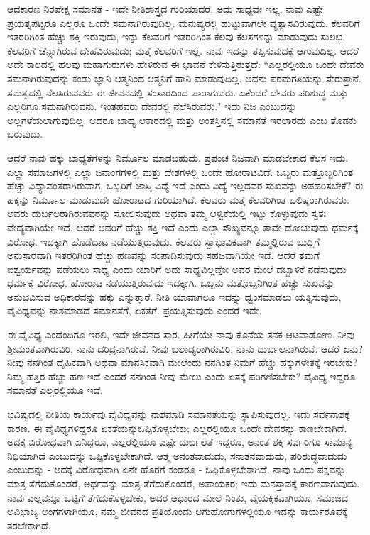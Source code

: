 ಆದಕಾರಣ ನಿರಪೇಕ್ಷ ಸಮಾನತೆ  - ಇದೇ ನೀತಿಶಾಸ್ತ್ರದ ಗುರಿಯಾದರೆ, ಅದು ಸಾಧ್ಯವೇ ಇಲ್ಲ. ನಾವು ಎಷ್ಟೇ ಪ್ರಯತ್ನಪಟ್ಟರೂ ಎಲ್ಲರೂ ಒಂದೇ ಸಮನಾಗಿರುವುದಿಲ್ಲ. ಮನುಷ್ಯರಲ್ಲಿ ಹುಟ್ಟುವಾಗಲೇ ವ್ಯತ್ಯಾಸವಿರುವುದು. ಕೆಲವರಿಗೆ ಇತರರಿಗಿಂತ ಹೆಚ್ಚು ಶಕ್ತಿ ಇರುವುದು, ಇನ್ನು ಕೆಲವರಿಗೆ ಇತರರಿಗಿಂತ ಕೆಲವು ಕೆಲಸಗಳನ್ನು ಮಾಡುವುದು ಸುಲಭ. ಕೆಲವರಿಗೆ ಚೆನ್ನಾಗಿರುವ ದೇಹವಿರುವುದು; ಮತ್ತೆ ಕೆಲವರಿಗೆ ಇಲ್ಲ. ನಾವು ಇದನ್ನು ತಪ್ಪಿಸುವುದಕ್ಕೆ ಆಗುವುದಿಲ್ಲ. ಆದರೆ ಅದೇ ಕಾಲದಲ್ಲಿ ಹಲವು ಮಹಾಗುರುಗಳು ಹೇಳಿರುವ ಈ ಭಾವನೆ ಕೇಳಿಸುತ್ತಿರುತ್ತದೆ: “ಎಲ್ಲರಲ್ಲಿಯೂ ಒಂದೇ ದೇವರು ಸಮನಾಗಿರುವುದನ್ನು ಕಂಡು ಜ್ಞಾನಿ ಆತ್ಮನಿಂದ ಆತ್ಮನಿಗೆ ಹಾನಿ ಮಾಡುವುದಿಲ್ಲ. ಅವನು ಪರಮಗತಿಯನ್ನು ಸೇರುತ್ತಾನೆ. ಸಮತ್ವದಲ್ಲಿ ನೆಲಸಿರುವವರು ಈ ಜೀವನದಲ್ಲಿ ಸಂಸಾರದಿಂದ ಪಾರಾಗುವರು. ಏಕೆಂದರೆ ದೇವರು ಪರಿಶುದ್ಧ ಮತ್ತು ಎಲ್ಲರಿಗೂ ಸಮನಾಗಿರುವನು. ಇಂತಹವರು ದೇವರಲ್ಲಿ ನೆಲೆಸಿರುವರು." ಇದು ನಿಜ ಎಂಬುದನ್ನು ಅಲ್ಲಗಳೆಯಲಾಗುವುದಿಲ್ಲ. ಆದರೂ ಬಾಹ್ಯ ಆಕಾರದಲ್ಲಿ ಮತ್ತು ಅಂತಸ್ತಿನಲ್ಲಿ ಸಮಾನತೆ ಇರಲಾರದು ಎಂಬ ತೊಡಕು ಬರುವುದು.

ಆದರೆ ನಾವು ಹಕ್ಕು ಬಾಧ್ಯತೆಗಳನ್ನು ನಿರ್ಮೂಲ ಮಾಡಬಹುದು. ಪ್ರಪಂಚ ನಿಜವಾಗಿ ಮಾಡಬೇಕಾದ ಕೆಲಸ ಇದು. ಎಲ್ಲಾ ಸಮಾಜಗಳಲ್ಲಿ ಎಲ್ಲಾ ಜನಾಂಗಗಳಲ್ಲಿ ಮತ್ತು ದೇಶಗಳಲ್ಲಿ ಒಂದೇ ಹೋರಾಟವಿದೆ. ಒಬ್ಬರು ಮತ್ತೊಬ್ಬರಿಗಿಂತ ಹೆಚ್ಚು ವಿದ್ಯಾವಂತರಾಗಿರುವಾಗ, ಒಬ್ಬರಿಗೆ ಜಾಸ್ತಿ ವಿದ್ಯೆ ಇದೆ ಎಂದು ವಿದ್ಯೆ ಇಲ್ಲದವರ ಸುಖವನ್ನು ಅಪಹರಿಸಬೇಕೆ? ಈ ಹಕ್ಕನ್ನು ನಿರ್ಮೂಲ ಮಾಡುವುದೇ ಹೋರಾಟದ ಗುರಿಯಾಗಿದೆ. ಕೆಲವರು ಮತ್ತೆ ಕೆಲವರಿಗಿಂತ ಬಲಿಷ್ಠರಾಗಿರುವರು. ಅವರು ದುರ್ಬಲರಾಗಿರುವವರನ್ನು ಸೋಲಿಸುವುದು ಅಥವಾ ತಮ್ಮ ಆಳ್ವಿಕೆಯಲ್ಲಿ ಇಟ್ಟು ಕೊಳ್ಳುವುದು ಸ್ವತಃ ವೇದ್ಯವಾಗಿಯೇ ಇದೆ. ಆದರೆ ಅವರಿಗೆ ಹೆಚ್ಚು ಶಕ್ತಿ ಇದೆ ಎಂದು ಎಲ್ಲಾ ಸೌಖ್ಯವನ್ನೂ ತಾವೇ ದೋಚುವುದು ಧರ್ಮಕ್ಕೆ ವಿರೋಧ. ಇದಕ್ಕಾಗಿ ಹೊಡೆದಾಟ ನಡೆಯುತ್ತಿರುವುದು. ಕೆಲವರು ಸ್ವಾಭಾವಿಕವಾಗಿ ತಮ್ಮಲ್ಲಿರುವ ಬುದ್ದಿಗೆ ಅನುಸಾರವಾಗಿ ಇತರರಿಗಿಂತ ಹೆಚ್ಚು ಹಣವನ್ನು ಸಂಪಾದಿಸುವುದು ಸಹಜವಾಗಿಯೇ ಇದೆ. ಆದರೆ ತಮಗೆ ಐಶ್ವರ್ಯವನ್ನು ಪಡೆಯಲು ಸಾಧ್ಯ ಎಂದು ಯಾರಿಗೆ ಅದು ಸಾಧ್ಯವಿಲ್ಲವೋ ಅವರ ಮೇಲೆ ದಬ್ಬಾಳಿಕೆ ನಡೆಸುವುದು ಧರ್ಮಕ್ಕೆ ವಿರೋಧ. ಹೋರಾಟ ನಡೆಯುತ್ತಿರುವುದು ಇದಕ್ಕಾಗಿ. ಒಬ್ಬನು ಮತ್ತೊಬ್ಬನಿಗಿಂತ ಹೆಚ್ಚು ಸುಖವನ್ನು ಅನುಭವಿಸುವ ಅಧಿಕಾರವನ್ನು ಹಕ್ಕು ಎನ್ನುತ್ತಾರೆ. ನೀತಿ ಯಾವಾಗಲೂ ಇದನ್ನು ಧ್ವಂಸಮಾಡಲು ಯತ್ನಿಸುವುದು, ವೈವಿಧ್ಯವನ್ನು ನಾಶಮಾಡದೆ ಸಮಾನತೆಗೆ, ಏಕತೆಗೆ. ಪ್ರಯತ್ನಿಸುವುದು ಎಂದರೆ ಇದೇ.

ಈ ವೈವಿಧ್ಯ ಎಂದೆಂದಿಗೂ ಇರಲಿ, ಇದೇ ಜೀವನದ ಸಾರ. ಹೀಗೆಯೇ ನಾವು ಕೊನೆಯ ತನಕ ಆಟವಾಡೋಣ. ನೀವು ಶ‍್ರೀಮಂತವಾಗಿರುವಿರಿ, ನಾನು ದರಿದ್ರನಾಗಿರುವೆ. ನೀವು ಬಲಾಡ್ಯರಾಗಿರುವಿರಿ, ನಾನು ದುರ್ಬಲನಾಗಿರುವೆ. ಆದರೆ ಏನು? ನೀವು ನನಗಿಂತ ದೈಹಿಕವಾಗಿ ಅಥವಾ ಮಾನಸಿಕವಾಗಿ ಮೇಲೆಂದು ನನಗಿಂತ ನಿಮಗೆ ಹೆಚ್ಚು ಹಕ್ಕುಗಳೇತಕ್ಕೆ ಇರಬೇಕು? ನಿಮ್ಮ ಹತ್ತಿರ ಹೆಚ್ಚು ಹಣ ಇದೆ ಎಂದರೆ ನನಗಿಂತ ನೀವು ಮೇಲು ಎಂದು ಏತಕ್ಕೆ ಪರಿಗಣಿಸಬೇಕು? ವೈವಿಧ್ಯ ಇದ್ದರೂ ಸಮಾನತೆ ಎಲ್ಲರಲ್ಲಿಯೂ ಇದೆ.

ಭವಿಷ್ಯದಲ್ಲಿ ನೀತಿಯ ಕಾರ್ಯವು ವೈವಿಧ್ಯವನ್ನು ನಾಶಮಾಡಿ ಸಮಾನತೆಯನ್ನು ಸ್ಥಾಪಿಸುವುದಲ್ಲ. ಇದು ಸರ್ವನಾಶಕ್ಕೆ ಕಾರಣ. ಈ ವೈವಿಧ್ಯಗಳಿದ್ದರೂ ಏಕತೆಯನ್ನು\break ಒಪ್ಪಿಕೊಳ್ಳಬೇಕು; ಎಲ್ಲರಲ್ಲಿಯೂ ಒಂದೇ ದೇವರನ್ನು ಕಾಣಬೇಕಾಗಿದೆ. ಅದಕ್ಕೆ ವಿರೋಧವಾಗಿ ಏನಿದ್ದರೂ, ಎಲ್ಲರಲ್ಲಿಯೂ ಎಷ್ಟೇ ದುರ್ಬಲತೆ ಇದ್ದರೂ, ಅನಂತ ಶಕ್ತಿ ಸರ್ವರಿಗೂ ಸಾಮಾನ್ಯ ನಿಧಿಯಾಗಿದೆ ಎಂಬುದನ್ನು ಒಪ್ಪಿಕೊಳ್ಳಬೇಕಾಗಿದೆ. ಆತ್ಮ ಅನಂತವಾದುದು, ಸನಾತನವಾದುದು, ಪರಿಶುದ್ಧವಾದುದು ಎಂಬುದನ್ನು - ಅದಕ್ಕೆ ವಿರೋಧವಾಗಿ ಏನೇ ಹೊರಗೆ ಕಂಡರೂ - ಒಪ್ಪಿಕೊಳ್ಳಬೇಕಾಗಿದೆ. ನಾವು ಒಂದು ಪಕ್ಷವನ್ನು ಮಾತ್ರ ತೆಗೆದುಕೊಂಡರೆ, ಅರ್ಧವನ್ನು ಮಾತ್ರ ತೆಗೆದುಕೊಂಡರೆ, ಅಪಾಯಕರ; ಇದು ಮನಸ್ತಾಪಕ್ಕೆ ಕಾರಣವಾಗುವುದು. ನಾವು ಎಲ್ಲವನ್ನೂ ಒಟ್ಟಿಗೆ ತೆಗೆದುಕೊಳ್ಳಬೇಕು, ಅದರ ಆಧಾರದ ಮೇಲೆ ನಿಂತು, ವೈಯಕ್ತಿಕವಾಗಿಯೂ, ಸಮಾಜದ ಅವಿಭಾಜ್ಯ ಅಂಗಗಳಾಗಿಯೂ, ನಮ್ಮ ಜೀವನದ ಪ್ರತಿಯೊಂದು ಆಗುಹೋಗುಗಳಲ್ಲಿಯೂ ಇದನ್ನು ಕಾರ್ಯರೂಪಕ್ಕೆ ತರಬೇಕಾಗಿದೆ.


